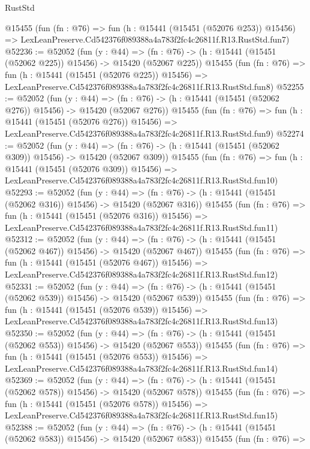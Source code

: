 \begin{lexlean}{RustStd}
\begin{coremodule}
    @15455
    (fun (fn : @76) =>
    fun (h : @15441 (@15451 (@52076 @253)) @15456) =>
    LexLeanPreserve.Cd542376f089388a4a783f2fc4c26811f.R13.RustStd.fun7)
@52236 := @52052
    (fun (y : @44) =>
    (fn : @76) -> (h : @15441 (@15451 (@52062 @225)) @15456) -> @15420 (@52067 @225))
    @15455
    (fun (fn : @76) =>
    fun (h : @15441 (@15451 (@52076 @225)) @15456) =>
    LexLeanPreserve.Cd542376f089388a4a783f2fc4c26811f.R13.RustStd.fun8)
@52255 := @52052
    (fun (y : @44) =>
    (fn : @76) -> (h : @15441 (@15451 (@52062 @276)) @15456) -> @15420 (@52067 @276))
    @15455
    (fun (fn : @76) =>
    fun (h : @15441 (@15451 (@52076 @276)) @15456) =>
    LexLeanPreserve.Cd542376f089388a4a783f2fc4c26811f.R13.RustStd.fun9)
@52274 := @52052
    (fun (y : @44) =>
    (fn : @76) -> (h : @15441 (@15451 (@52062 @309)) @15456) -> @15420 (@52067 @309))
    @15455
    (fun (fn : @76) =>
    fun (h : @15441 (@15451 (@52076 @309)) @15456) =>
    LexLeanPreserve.Cd542376f089388a4a783f2fc4c26811f.R13.RustStd.fun10)
@52293 := @52052
    (fun (y : @44) =>
    (fn : @76) -> (h : @15441 (@15451 (@52062 @316)) @15456) -> @15420 (@52067 @316))
    @15455
    (fun (fn : @76) =>
    fun (h : @15441 (@15451 (@52076 @316)) @15456) =>
    LexLeanPreserve.Cd542376f089388a4a783f2fc4c26811f.R13.RustStd.fun11)
@52312 := @52052
    (fun (y : @44) =>
    (fn : @76) -> (h : @15441 (@15451 (@52062 @467)) @15456) -> @15420 (@52067 @467))
    @15455
    (fun (fn : @76) =>
    fun (h : @15441 (@15451 (@52076 @467)) @15456) =>
    LexLeanPreserve.Cd542376f089388a4a783f2fc4c26811f.R13.RustStd.fun12)
@52331 := @52052
    (fun (y : @44) =>
    (fn : @76) -> (h : @15441 (@15451 (@52062 @539)) @15456) -> @15420 (@52067 @539))
    @15455
    (fun (fn : @76) =>
    fun (h : @15441 (@15451 (@52076 @539)) @15456) =>
    LexLeanPreserve.Cd542376f089388a4a783f2fc4c26811f.R13.RustStd.fun13)
@52350 := @52052
    (fun (y : @44) =>
    (fn : @76) -> (h : @15441 (@15451 (@52062 @553)) @15456) -> @15420 (@52067 @553))
    @15455
    (fun (fn : @76) =>
    fun (h : @15441 (@15451 (@52076 @553)) @15456) =>
    LexLeanPreserve.Cd542376f089388a4a783f2fc4c26811f.R13.RustStd.fun14)
@52369 := @52052
    (fun (y : @44) =>
    (fn : @76) -> (h : @15441 (@15451 (@52062 @578)) @15456) -> @15420 (@52067 @578))
    @15455
    (fun (fn : @76) =>
    fun (h : @15441 (@15451 (@52076 @578)) @15456) =>
    LexLeanPreserve.Cd542376f089388a4a783f2fc4c26811f.R13.RustStd.fun15)
@52388 := @52052
    (fun (y : @44) =>
    (fn : @76) -> (h : @15441 (@15451 (@52062 @583)) @15456) -> @15420 (@52067 @583))
    @15455
    (fun (fn : @76) =>

\end{coremodule}
\end{lexlean}
